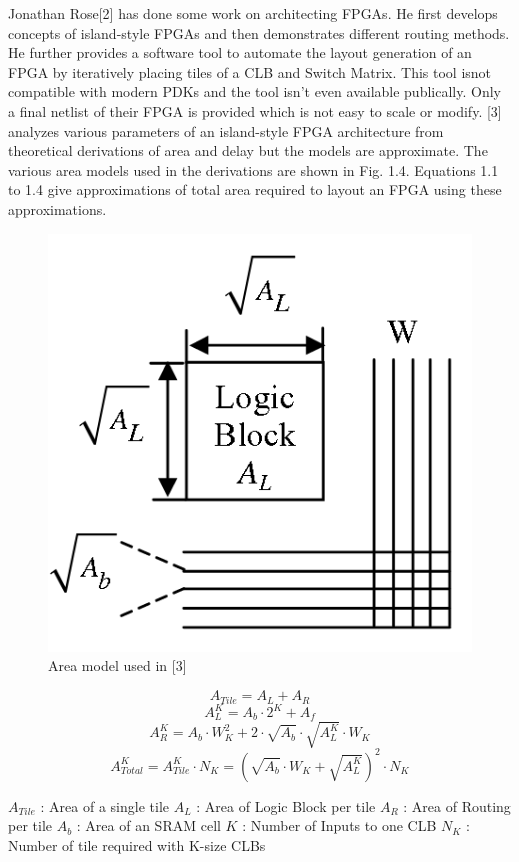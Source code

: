 Jonathan Rose[2] has done some work on architecting FPGAs. He first develops concepts of island-style FPGAs and then demonstrates different routing methods. He further provides a software tool to automate the layout generation of an FPGA by iteratively placing tiles of a CLB and Switch Matrix. This tool isnot compatible with modern PDKs and the tool isn't even available publically. Only a final netlist of their FPGA is provided which is not easy to scale or modify. 
[3] analyzes various parameters of an island-style FPGA architecture from theoretical derivations of area and delay but the models are approximate. The various area models used in the derivations are shown in Fig. 1.4. Equations 1.1 to 1.4 give approximations of total area required to layout an FPGA using these approximations. 

\begin{figure}[h]
\centering
\includegraphics[width=0.3\linewidth]{area_model.png}
\caption{Area model used in [3]}
\label{fig:Figure}
\end{figure}

\begin{equation}
A_{Tile} = A_L + A_R
\end{equation}
\begin{equation}
A_L^K = A_b\cdot2^K + A_f
\end{equation}
\begin{equation}
A_R^K = A_b{\cdot}W_K^2 + 2\cdot\sqrt{A_b}\cdot\sqrt{A_L^K}{\cdot}W_K
\end{equation}
\begin{equation}
A_{Total}^K = A_{Tile}^K{\cdot}N_K = {(\sqrt{A_b}{\cdot}W_K + \sqrt{A_L^K})}^2{\cdot}N_K
\end{equation}

$A_{Tile}$ : Area of a single tile \hfill
$A_L$ : Area of Logic Block per tile \hfill
$A_R$ : Area of Routing per tile \hfill
$A_b$ : Area of an SRAM cell \hfill
$K$ : Number of Inputs to one CLB \hfill
$N_K$ : Number of tile required with K-size CLBs \hfill

